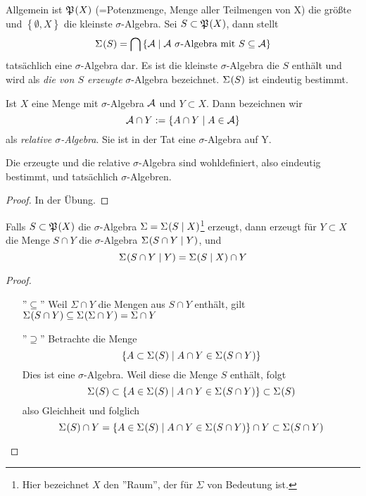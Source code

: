 \documentclass[skript.tex]{subfiles}
\begin{document}
	\begin{defin}
		Allgemein ist $\mf{P}\pr{X}$ (=Potenzmenge, Menge aller Teilmengen von X) die größte und $\left\{\emptyset, X \right\}$ die kleinste $\sigma$-Algebra. Sei $S \subset \mf{P}\pr{X}$, dann stellt
		\begin{equation*}
			\Sigma\pr{S} = \bigcap\left\{ \mc{A} \mid \mc{A}\ \sigma\text{-Algebra mit } S \subseteq \mc{A}\right\}
		\end{equation*}
		tatsächlich eine $\sigma$-Algebra dar. Es ist die kleinste $\sigma$-Algebra die $S$ enthält und wird als \textit{die von $S$ erzeugte} $\sigma$-Algebra bezeichnet. $\Sigma\pr{S}$ ist eindeutig bestimmt.
		
		Ist $X$ eine Menge mit $\sigma$-Algebra $\mathcal{A}$ und $Y \subset X$. Dann bezeichnen wir
		\begin{equation*}
			\mathcal{A}\cap Y := \left\{A\cap Y \mid A \in \mathcal{A} \right\}
		\end{equation*}
		als \textit{relative $\sigma$-Algebra}. Sie ist in der Tat eine $\sigma$-Algebra auf Y.
	\end{defin}

	\begin{lem}
		Die erzeugte und die relative $\sigma$-Algebra sind wohldefiniert, also eindeutig bestimmt, und tatsächlich $\sigma$-Algebren.
	\end{lem}
	\begin{proof}
		In der Übung.
	\end{proof}

	\begin{beh*}
		Falls $S\subset \mf{P}\pr{X}$ die $\sigma$-Algebra $\Sigma = \Sigma\pr{S\mid X}$\footnote{Hier bezeichnet $X$ den ''Raum'', der für $\Sigma$ von Bedeutung ist. } erzeugt, dann erzeugt für $Y \subset X$ die Menge $S \cap Y$ die $\sigma$-Algebra $\Sigma\pr{S\cap Y\mid Y}$, und
		\begin{equation*}
			\Sigma\pr{S\cap Y \mid Y} = \Sigma\pr{S\mid X} \cap Y
		\end{equation*}
	\end{beh*}
	\begin{proof}\hfill 
		\begin{itemize}
			\item[''$\subseteq$''] Weil $\Sigma \cap Y$ die Mengen aus $S \cap Y$ enthält, gilt $\Sigma\pr{S\cap Y} \subseteq \Sigma\pr{\Sigma \cap Y} = \Sigma \cap Y$ 
			\item[''$\supseteq$''] Betrachte die Menge
				\begin{equation*}
					\cbr{A \subset \Sigma\pr{S} \mid A \cap Y \in \Sigma\pr{S\cap Y}}
				\end{equation*}
				Dies ist eine $\sigma$-Algebra. Weil diese die Menge $S$ enthält, folgt
				\begin{equation*}
					\Sigma\pr{S} \subset \cbr{A \in \Sigma\pr{S} \mid A \cap Y \in \Sigma\pr{S\cap Y}} \subset \Sigma\pr{S}
				\end{equation*}
				also Gleichheit und folglich 
				\[
					\Sigma\pr{S} \cap Y = \cbr{A \in \Sigma\pr{S} \mid A \cap Y \in \Sigma\pr{S \cap Y}} \cap Y \subset \Sigma\pr{S \cap Y}
				\]
		\end{itemize}
	\end{proof}
	
\end{document}
